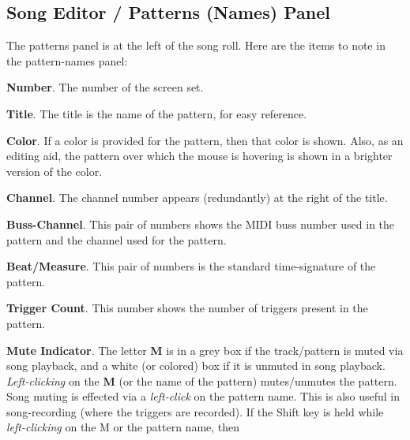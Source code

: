 \subsection{Song Editor / Patterns (Names) Panel}
\label{subsec:song_editor_patterns_panel}

   The patterns panel is at the left of the song roll.
   Here are the items to note in the pattern-names panel:

   \begin{enumber}
      \item \textbf{Number}.
         The number of the screen set.
      \item \textbf{Title}.
         The title is the name of the pattern, for easy reference.
      \item \textbf{Color}.
         If a color is provided for the pattern, then that color is shown.
         Also, as an editing aid, the pattern over which the mouse is hovering
         is shown in a brighter version of the color.
      \item \textbf{Channel}.
         The channel number appears (redundantly)
         at the right of the title.
      \item \textbf{Buss-Channel}.
         This pair of numbers shows the MIDI buss number used in the pattern
         and the channel used for the pattern.
      \item \textbf{Beat/Measure}.
         This pair of numbers is the standard time-signature of the pattern.
      \item \textbf{Trigger Count}.
         This number shows the number of triggers present in the pattern.
      \item \textbf{Mute Indicator}.
         The letter \textbf{M} is in a grey box if the track/pattern
         is muted via song playback,
         and a white (or colored) box if it is unmuted in song playback.
         \textsl{Left-clicking} on the \textbf{M} (or the name of the pattern)
         mutes/unmutes the pattern.
         Song muting is effected via a \textsl{left-click} on the pattern name.
         This is also useful in song-recording (where the triggers are recorded).
         If the Shift key is held while \textsl{left-clicking}
         on the M or the pattern name, then

\end{enumber}
